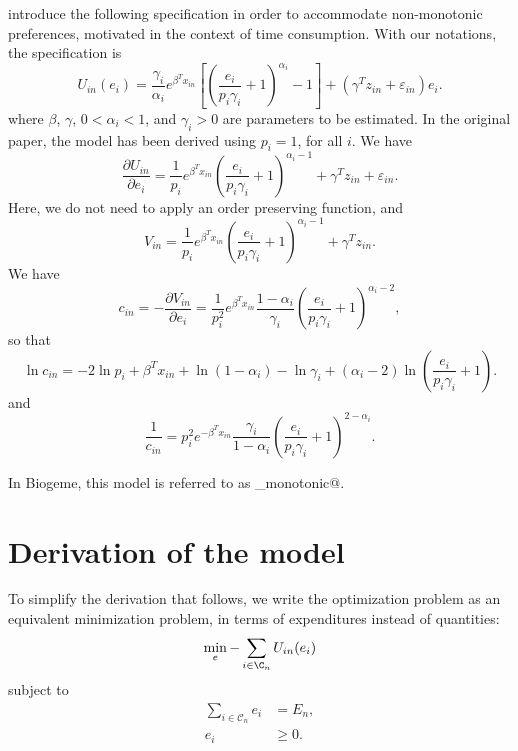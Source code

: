\documentclass[12pt,a4paper]{article}
\begin{document}
 introduce the following specification in order to accommodate non-monotonic preferences, motivated in the context of time consumption. With our notations, the specification is
\[
U_{in}(e_i) = \frac{\gamma_i}{\alpha_i} e^{\beta^T x_{in}}\left[\left(\frac{e_i}{p_i \gamma_i}+1\right)^{\alpha_i}-1\right]+(\gamma^T z_{in} + \varepsilon_{in}) e_i.
\]
where $\beta$, $\gamma$, $0 < \alpha_i < 1$, and $\gamma_i > 0$  are parameters to be
estimated. In the original paper, the model has been derived using $p_i=1$, for all $i$.
We have
\[
\frac{\partial U_{in}}{\partial e_i} = \frac{1}{p_i} e^{\beta^T x_{in}}  \left(\frac{e_i}{p_i \gamma_i}+1\right)^{\alpha_i-1} + \gamma^T z_{in} + \varepsilon_{in}.
\]
Here, we do not need to apply an order preserving function, and
\[
V_{in} = \frac{1}{p_i} e^{\beta^T x_{in}}  \left(\frac{e_i}{p_i \gamma_i}+1\right)^{\alpha_i-1} + \gamma^T z_{in}.
\]
We have
\[
c_{in} = -\frac{\partial V_{in}}{\partial e_i} =  \frac{1}{p^2_i} e^{\beta^T x_{in}} \frac{1-\alpha_i}{\gamma_i}\left(\frac{e_i}{p_i \gamma_i}+1\right)^{\alpha_i-2},
\]
so that
\[
\ln c_{in} = -2\ln p_i + \beta^T x_{in} + \ln (1-\alpha_i) -\ln \gamma_i +(\alpha_i-2) \ln\left(\frac{e_i}{p_i \gamma_i}+1\right).
\]
and
\[
\frac{1}{c_{in}} =  p^2_i e^{-\beta^T x_{in}} \frac{\gamma_i}{1-\alpha_i}\left(\frac{e_i}{p_i \gamma_i}+1\right)^{2-\alpha_i}.
\]

In Biogeme, this model is referred to as \lstinline@non_monotonic@.


%
%





\appendix
\section{Derivation of the model}
\label{eq:derivation}
To simplify the derivation that follows, we write the
optimization problem as an equivalent minimization problem, in terms
of expenditures instead of quantities:
\begin{equation}
\min_{e} -\sum_{i \in \C_n} U_{in}(e_i)
\end{equation}
subject to
\begin{align}
  \sum_{i \in \mathcal{C}_n} e_i &= E_n, \label{eq:budget_constraint}\\
 e_{i} &\geq 0. \label{eq:non_negativity}
\end{align}
\end{document}

